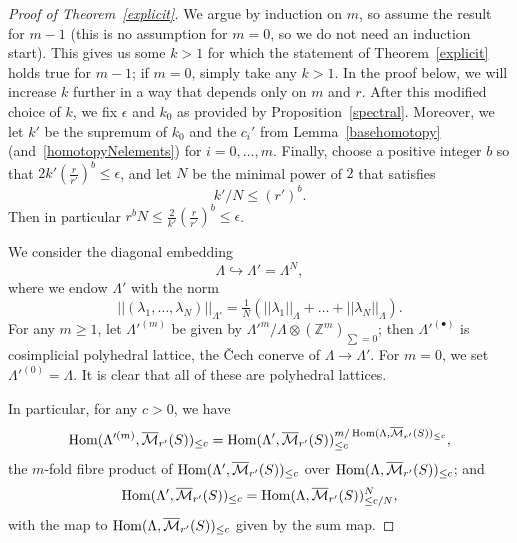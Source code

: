 \begin{proof}[Proof of Theorem~\ref{explicit}]
  We argue by induction on $m$, so assume the result for $m-1$
  (this is no assumption for $m=0$, so we do not need an induction start).
  This gives us some $k>1$ for which the statement of Theorem~\ref{explicit} holds true for $m-1$;
  if $m=0$, simply take any $k>1$.
  In the proof below, we will increase $k$ further in a way that depends only on $m$ and $r$.
  After this modified choice of $k$, we fix $\epsilon$ and $k_0$ as provided by Proposition~\ref{spectral}.
  Moreover, we let $k'$ be the supremum of $k_0$ and the $c_i'$ from
  Lemma~\ref{basehomotopy} (and~\ref{homotopyNelements}) for $i=0,\ldots,m$.
  Finally, choose a positive integer $b$ so that $2k'(\tfrac r{r'})^b\leq \epsilon$,
  and let $N$ be the minimal power of $2$ that satisfies
\[
k'/N\leq (r')^b.
\]
Then in particular $r^bN\leq \frac 2{k'}(\tfrac{r}{r'})^b\leq \epsilon$.

We consider the diagonal embedding
\[
\Lambda\hookrightarrow \Lambda' = \Lambda^N,
\]
where we endow $\Lambda'$ with the norm
\[
||(\lambda_1,\ldots,\lambda_N)||_{\Lambda'} = \tfrac 1N(||\lambda_1||_\Lambda+\ldots+||\lambda_N||_\Lambda).
\]
For any $m\geq 1$, let $\Lambda'^{(m)}$ be given by $\Lambda'^m / \Lambda\otimes (\mathbb Z^m)_{\sum=0}$; then $\Lambda'^{(\bullet)}$ is cosimplicial polyhedral lattice, the \v{C}ech conerve of $\Lambda\to \Lambda'$. For $m=0$, we set $\Lambda'^{(0)} = \Lambda$. It is clear that all of these are polyhedral lattices.

In particular, for any $c>0$, we have
\[
\operatorname{Hom}(\Lambda'^{(m)},\overline{\mathcal M}_{r'}(S))_{\leq c} = \operatorname{Hom}(\Lambda',\overline{\mathcal M}_{r'}(S))_{\leq c}^{m/\operatorname{Hom}(\Lambda,\overline{\mathcal M}_{r'}(S))_{\leq c}},
\]
the $m$-fold fibre product of $\operatorname{Hom}(\Lambda',\overline{\mathcal M}_{r'}(S))_{\leq c}$ over $\operatorname{Hom}(\Lambda,\overline{\mathcal M}_{r'}(S))_{\leq c}$; and
\[
\operatorname{Hom}(\Lambda',\overline{\mathcal M}_{r'}(S))_{\leq c} = \operatorname{Hom}(\Lambda,\overline{\mathcal M}_{r'}(S))_{\leq c/N}^N,
\]
with the map to $\operatorname{Hom}(\Lambda,\overline{\mathcal M}_{r'}(S))_{\leq c}$ given by the sum map.


\end{proof}
